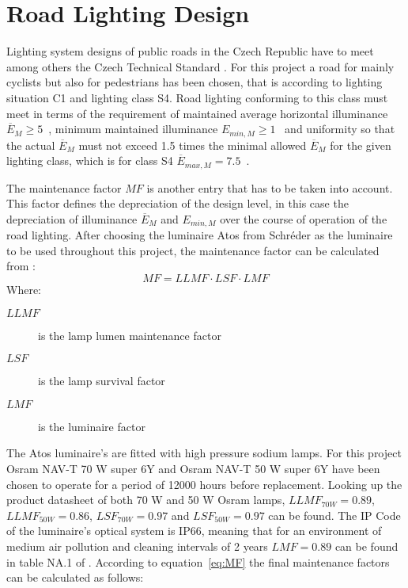 \section{Road Lighting Design}
\label{sec:Road_Lighting_Design}
Lighting system designs of public roads in the Czech Republic have to meet among others the Czech Technical Standard \cite{CSN_EN_13201-2}. For this project a road for mainly cyclists but also for pedestrians has been chosen, that is according to \cite{CSN_EN_13201-1} lighting situation C1 and lighting class S4. Road lighting conforming to this class must meet in terms of \cite{CSN_EN_13201-2} the requirement of maintained average horizontal illuminance $\overline{E}_{M}\geq 5$~, minimum maintained illuminance $E_{min,M}\geq 1$~ and uniformity so that the actual $\overline{E}_{M}$ must not exceed 1.5 times the minimal allowed $\overline{E}_{M}$ for the given lighting class, which is for class S4 $\overline{E}_{max,M} = 7.5$~.

The maintenance factor $MF$ is another entry that has to be taken into account. This factor defines the depreciation of the design level, in this case the depreciation of illuminance $\overline{E}_{M}$ and $E_{min,M}$ over the course of operation of the road lighting. After choosing the luminaire Atos from Schr\'{e}der as the luminaire to be used throughout this project, the maintenance factor can be calculated from \cite{CSN_EN_13201-2_Z1}:
\begin{equation} \label{eq:MF}
MF = LLMF \cdot LSF \cdot LMF
\end{equation}
Where:
\begin{description}
	\item[$LLMF$] is the lamp lumen maintenance factor
	\item[$LSF$] is the lamp survival factor
	\item[$LMF$] is the luminaire factor
\end{description}

The Atos luminaire's are fitted with high pressure sodium lamps. For this project Osram NAV-T 70 W super 6Y and Osram NAV-T 50 W super 6Y have been chosen to operate for a period of 12000 hours before replacement. Looking up the product datasheet \cite{Osram} of both 70 W and 50 W Osram lamps, $LLMF_{70W}=0.89$, $LLMF_{50W}=0.86$, $LSF_{70W}=0.97$ and $LSF_{50W}=0.97$ can be found. The IP Code of the luminaire's optical system is IP66, meaning that for an environment of medium air pollution and cleaning intervals of 2 years $LMF=0.89$ can be found in table NA.1 of \cite{CSN_EN_13201-2_Z1}. According to equation~\ref{eq:MF} the final maintenance factors can be calculated as follows:


